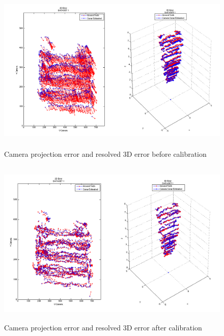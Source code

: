 \documentclass[a4paper]{IEEEtran}
\begin{document}
\begin{figure}
  \includegraphics[width=\textwidth,height=8cm]{1}
  \caption{Camera projection error and resolved 3D error before calibration}
\end{figure}

\begin{figure}
  \includegraphics[width=\textwidth,height=8cm]{4}
  \caption{Camera projection error and resolved 3D error after calibration}
\end{figure}
\end{document}
